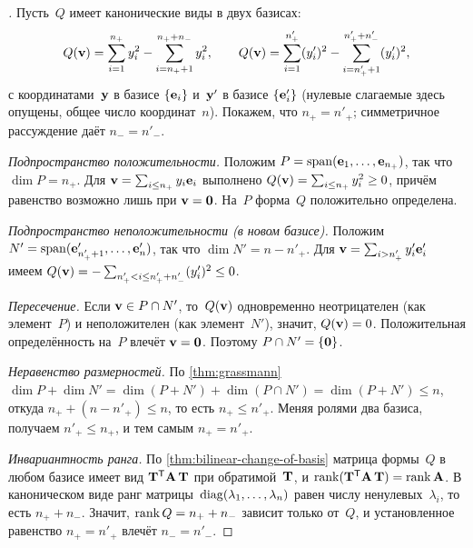 \begin{proof}[]
Пусть~$Q$ имеет канонические виды в двух базисах:
\[
  Q(\mathbf{v}) = \sum_{i=1}^{n_+} y_i^2 - \sum_{i=n_+ + 1}^{n_+ + n_-} y_i^2,
  \qquad
  Q(\mathbf{v}) = \sum_{i=1}^{n'_+} (y'_i)^2 - \sum_{i=n'_+ + 1}^{n'_+ + n'_-} (y'_i)^2,
\]
с координатами~$\mathbf{y}$ в базисе $\{\mathbf{e}_i\}$ и~$\mathbf{y}'$ в
базисе $\{\mathbf{e}'_i\}$ (нулевые слагаемые здесь опущены, общее число
координат~$n$). Покажем, что $n_+ = n'_+$; симметричное рассуждение
даёт $n_- = n'_-$.

\emph{Подпространство положительности.} Положим
$P = \operatorname{span}(\mathbf{e}_1, \dots, \mathbf{e}_{n_+})$, так что $\dim P = n_+$.
Для $\mathbf{v} = \sum_{i \le n_+} y_i \mathbf{e}_i$
выполнено $Q(\mathbf{v}) = \sum_{i \le n_+} y_i^2 \ge 0$, причём равенство
возможно лишь при $\mathbf{v} = \mathbf{0}$. На~$P$ форма~$Q$ положительно
определена.

\emph{Подпространство неположительности (в новом базисе).} Положим
$N' = \operatorname{span}(\mathbf{e}'_{n'_+ + 1}, \dots, \mathbf{e}'_n)$, так что
$\dim N' = n - n'_+$. Для $\mathbf{v} = \sum_{i > n'_+} y'_i \mathbf{e}'_i$
имеем $Q(\mathbf{v}) = -\sum_{n'_+ < i \le n'_+ + n'_-} (y'_i)^2 \le 0$.

\emph{Пересечение.} Если $\mathbf{v} \in P \cap N'$, то~$Q(\mathbf{v})$
одновременно неотрицателен (как элемент~$P$) и неположителен (как
элемент~$N'$), значит, $Q(\mathbf{v}) = 0$. Положительная определённость
на~$P$ влечёт $\mathbf{v} = \mathbf{0}$. Поэтому $P \cap N' = \{\mathbf{0}\}$.

\emph{Неравенство размерностей.} По \cref{thm:grassmann}
$\dim P + \dim N' = \dim(P + N') + \dim(P \cap N') = \dim(P + N') \le n$,
откуда $n_+ + (n - n'_+) \le n$, то есть $n_+ \le n'_+$. Меняя ролями
два базиса, получаем $n'_+ \le n_+$, и тем самым $n_+ = n'_+$.

\emph{Инвариантность ранга.} По
\cref{thm:bilinear-change-of-basis} матрица формы~$Q$ в любом базисе
имеет вид $\mathbf{T}^{\mathsf{T}} \mathbf{A}\, \mathbf{T}$ при обратимой~$\mathbf{T}$, и
$\operatorname{rank}(\mathbf{T}^{\mathsf{T}} \mathbf{A}\, \mathbf{T}) = \operatorname{rank} \mathbf{A}$. В каноническом
виде ранг матрицы~$\operatorname{diag}(\lambda_1, \dots, \lambda_n)$ равен числу
ненулевых~$\lambda_i$, то есть $n_+ + n_-$. Значит, $\operatorname{rank} Q = n_+ + n_-$
зависит только от~$Q$, и установленное равенство $n_+ = n'_+$ влечёт
$n_- = n'_-$.
\end{proof}

